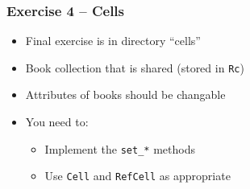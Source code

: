 \begin{frame}[fragile]
    \frametitle{Exercise 4 -- Cells}

    \begin{itemize}
        \item Final exercise is in directory ``cells''
        \item Book collection that is shared (stored in \texttt{Rc})
        \item Attributes of books should be changable
        \item You need to:
        \begin{itemize}
            \item Implement the \texttt{set\_*} methods
            \item Use \texttt{Cell} and \texttt{RefCell} as appropriate
        \end{itemize}
    \end{itemize}
\end{frame}
